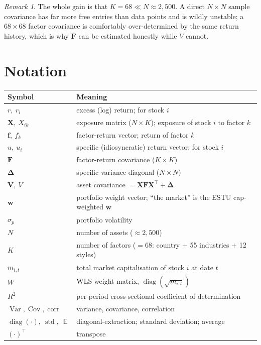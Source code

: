 \documentclass[11pt]{article}
\theoremstyle{definition}
\theoremstyle{plain}
\theoremstyle{remark}
\newtheorem*{remark}{Remark}
\DeclareMathOperator{\Var}{Var}
\DeclareMathOperator{\Cov}{Cov}
\DeclareMathOperator{\Corr}{corr}
\DeclareMathOperator{\diag}{diag}
\DeclareMathOperator{\std}{std}
\DeclareMathOperator*{\avg}{\mathbb{E}}
\newcommand{\T}{^{\!\top}}
\newcommand{\wvec}{\mathbf{w}}
\newcommand{\Xmat}{\mathbf{X}}
\newcommand{\Fmat}{\mathbf{F}}
\newcommand{\Vmat}{\mathbf{V}}
\newcommand{\Del}{\boldsymbol{\Delta}}
\newcommand{\fvec}{\mathbf{f}}
\begin{document}
\begin{remark}
The whole gain is that $K=68 \ll N\approx 2{,}500$. A direct $N\times N$ sample covariance has far more free entries than data points and is wildly unstable; a $68\times 68$ factor covariance is comfortably over-determined by the same return history, which is why $\Fmat$ can be estimated honestly while $V$ cannot.
\end{remark}

\section*{Notation}

\begin{center}
\small
\begin{tabular}{@{}ll@{}}
\toprule
Symbol & Meaning \\
\midrule
$r,\ r_i$ & excess (log) return; for stock $i$ \\
$\Xmat,\ X_{ik}$ & exposure matrix ($N\times K$); exposure of stock $i$ to factor $k$ \\
$\fvec,\ f_k$ & factor-return vector; return of factor $k$ \\
$u,\ u_i$ & specific (idiosyncratic) return vector; for stock $i$ \\
$\Fmat$ & factor-return covariance ($K\times K$) \\
$\Del$ & specific-variance diagonal ($N\times N$) \\
$\Vmat,\ V$ & asset covariance $=\Xmat\Fmat\Xmat\T+\Del$ \\
$\wvec$ & portfolio weight vector; ``the market'' is the ESTU cap-weighted $\wvec$ \\
$\sigma_p$ & portfolio volatility \\
$N$ & number of assets ($\approx 2{,}500$) \\
$K$ & number of factors ($=68$: country $+$ 55 industries $+$ 12 styles) \\
$m_{i,t}$ & total market capitalisation of stock $i$ at date $t$ \\
$W$ & WLS weight matrix, $\diag(\sqrt{m_{i,t}})$ \\
$R^2$ & per-period cross-sectional coefficient of determination \\
$\Var,\Cov,\Corr$ & variance, covariance, correlation \\
$\diag(\cdot),\ \std,\ \avg$ & diagonal-extraction; standard deviation; average \\
$(\cdot)\T$ & transpose \\
\bottomrule
\end{tabular}
\end{center}
\end{document}
